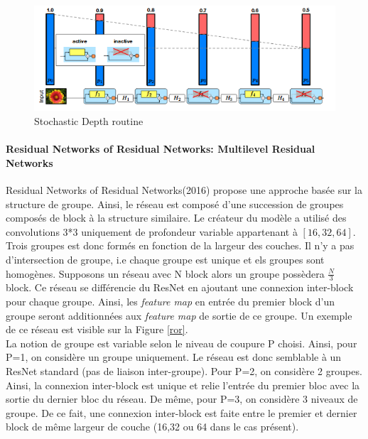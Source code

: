 \begin{figure}
    \centering
    \includegraphics[scale=0.4]{./tex/convolution-network/classifier/stores.png}
    \caption{Stochastic Depth routine}
    \label{stores_fig}
\end{figure}

\paragraph{Residual Networks of Residual Networks: Multilevel Residual Networks}

Residual Networks of Residual Networks\cite{RoR}(2016) propose une approche basée sur la structure de groupe. Ainsi, le réseau est composé d'une succession de groupes composés de block à la structure similaire. Le créateur du modèle a utilisé des convolutions 3*3 uniquement de profondeur variable appartenant à $[16,32,64]$. Trois groupes est donc formés en fonction de la largeur des couches. Il n'y a pas d'intersection de groupe, i.e chaque groupe est unique et els groupes sont homogènes. Supposons un réseau avec N block alors un groupe possèdera $\frac{N}{3}$ block. Ce réseau se différencie du ResNet en ajoutant une connexion inter-block pour chaque groupe. Ainsi, les \textit{feature map} en entrée du premier block d'un groupe seront additionnées aux \textit{feature map} de sortie de ce groupe. Un exemple de ce réseau est visible sur la Figure \ref{ror}.\\

\noindent La notion de groupe est variable selon le niveau de coupure P choisi. Ainsi, pour P=1, on considère un groupe uniquement. Le réseau est donc semblable à un ResNet standard (pas de liaison inter-groupe). Pour P=2, on considère 2 groupes. Ainsi, la connexion inter-block est unique et relie l'entrée du premier bloc avec la sortie du dernier bloc du réseau. De même, pour P=3, on considère 3 niveaux de groupe. De ce fait, une connexion inter-block est faite entre le premier et dernier block de même largeur de couche (16,32 ou 64 dans le cas présent). \\

